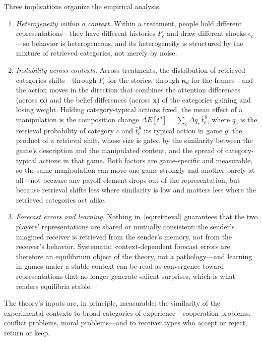 \documentclass[11pt]{article}
\theoremstyle{plain}
\theoremstyle{remark}
\begin{document}
Three implications organize the empirical analysis.
\begin{enumerate}
\item \emph{Heterogeneity within a context.} Within a treatment, people hold different representations---they have different histories $F_c$ and draw different shocks $\epsilon_c$---so behavior is heterogeneous, and its heterogeneity is structured by the mixture of retrieved categories, not merely by noise. 
\item \emph{Instability across contexts.} Across treatments, the distribution of retrieved categories shifts---through $F_c$ for the stories, through $\boldsymbol{\kappa}_d$ for the frames---and the action moves in the direction that combines the attention differences (across $\boldsymbol{\alpha}$) and the belief differences (across $\mathbf{x}$) of the categories gaining and losing weight. Holding category-typical actions fixed, the mean effect of a manipulation is the composition change $\Delta E[t^{g}]=\sum_{c}\Delta q_{c}\,\bar{t}_{c}^{\,g}$, where $q_{c}$ is the retrieval probability of category $c$ and $\bar{t}_{c}^{\,g}$ its typical action in game $g$: the product of a retrieval shift, whose size is gated by the similarity between the game's description and the manipulated content, and the spread of category-typical actions in that game. Both factors are game-specific and measurable, so the same manipulation can move one game strongly and another barely at all---not because any payoff element drops out of the representation, but because retrieval shifts less where similarity is low and matters less where the retrieved categories act alike.
\item \emph{Forecast errors and learning.} Nothing in~\eqref{eq:retrieval} guarantees that the two players' representations are shared or mutually consistent: the sender's imagined receiver is retrieved from the sender's memory, not from the receiver's behavior. Systematic, context-dependent forecast errors are therefore an equilibrium object of the theory, not a pathology---and learning in games under a stable context can be read as convergence toward representations that no longer generate salient surprises, which is what renders equilibria stable.
\end{enumerate}

The theory's inputs are, in principle, measurable: the similarity of the experimental contexts to broad categories of experience---cooperation problems, conflict problems, moral problems---and to receiver types who accept or reject, return or keep. 
\end{document}
